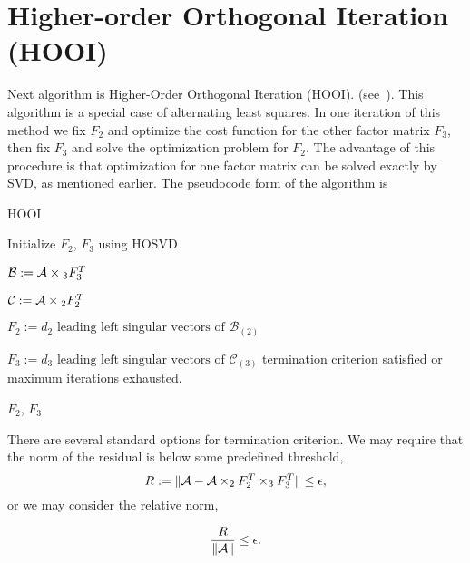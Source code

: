 \section{Higher-order Orthogonal Iteration (HOOI)}
\label{sec_hooi}

Next algorithm is Higher-Order Orthogonal Iteration (HOOI). (see~\cite{kolda_bader_2009}).
This algorithm is a special case of alternating least squares.
In one iteration of this method we fix $F_2$ and optimize the cost function for the other factor matrix $F_3$,
then fix $F_3$ and solve the optimization problem for $F_2$. 
The advantage of this procedure is that optimization for one factor matrix can be solved exactly
by SVD, as mentioned earlier. The pseudocode form of the algorithm is

\begin{algorithm}
\caption{HOOI}\label{HOOI}
\begin{algorithmic}[1]

\State Initialize $F_2$, $F_3$ using HOSVD
\Repeat 

$\mathcal{B} := \mathcal{A} \times{_3} F_3^T$
    
    
$\mathcal{C} := \mathcal{A} \times{_2} F_2^T$
    
    
$F_2 := d_2 \mbox{ leading left singular vectors of }{\mathcal{B}}_{(2)}$
    
    
    $F_3 := d_3 \mbox{ leading left singular vectors of }{\mathcal{C}}_{(3)}$
\Until termination criterion satisfied or maximum iterations exhausted.


\State \Return $F_2$, $F_3$


\EndFunction
\end{algorithmic}
\end{algorithm}


There are several standard options for termination criterion.
We may require that the norm of the residual is below
some predefined threshold,
\begin{equation}
    R := \| \mathcal{A} - \mathcal{A} \times_2 F_2^T \times_3 F_3^T \| \leq \epsilon,
\end{equation} 
or we may consider the relative norm,

\begin{equation}
    \frac{R}{\| \mathcal{A} \| } \leq \epsilon.
\end{equation} 


